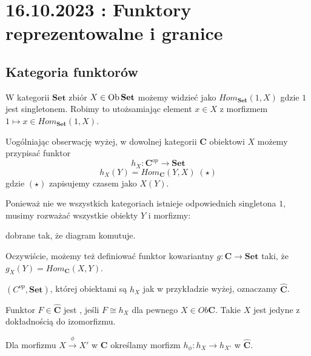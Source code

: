\section{16.10.2023 : Funktory reprezentowalne i granice}

\subsection{Kategoria funktorów}

W kategorii $\mathbf{Set}$ zbiór $X\in \operatorname{Ob}\mathbf{Set}$ możemy widzieć jako $Hom_{\mathbf{Set}}(1,X)$ gdzie $1$ jest singletonem. Robimy to utożsamiając element $x\in X$ z morfizmem $1\mapsto x\in Hom_{\mathbf{Set}}(1, X)$.

Uogólniając obserwację wyżej, w dowolnej kategorii $\mathbf{C}$ obiektowi $X$ możemy przypisać funktor 
    $$h_X:\mathbf{C}^{op}\to \mathbf{Set}$$
    $$h_X(Y)=Hom_{\mathbf{C}}(Y, X) \; (\star)$$
    gdzie $(\star)$ zapisujemy czasem jako $X(Y)$.

    Ponieważ nie we wszystkich kategoriach istnieje odpowiednich singletona $1$, musimy rozważać wszystkie obiekty $Y$ i morfizmy:
    
    \begin{center}\end{center}
    dobrane tak, że diagram komutuje.


    Oczywiście, możemy też definiować funktor kowariantny $g:\mathbf{C}\to\mathbf{Set}$ taki, że $g_X(Y)=Hom_{\mathbf{C}}(X, Y)$.

\begin{definition}
   $(C^{op},\mathbf{Set})$, której obiektami są $h_X$ jak w przykładzie wyżej, oznaczamy $\hat{\mathbf{C}}$. 

  Funktor $F\in\hat{\mathbf{C}}$ jest , jeśli $F\cong h_X$ dla pewnego $X\in Ob\mathbf{C}$. Takie $X$ jest jedyne z dokładnością do izomorfizmu.
 
  Dla morfizmu $X\xrightarrow{\phi} X'$ w $\mathbf{C}$ określamy morfizm $h_\phi:h_X\to h_{X'}$ w $\mathbf{\hat{C}}$.

  \begin{center}\end{center}
\end{definition}

